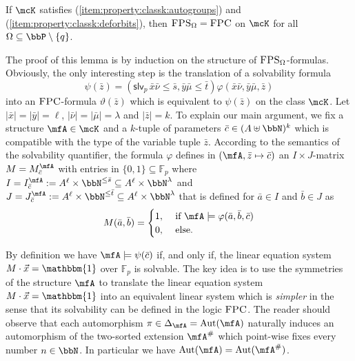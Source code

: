\documentclass[a4paper,UKenglish]{lipics}
\newcommand{\defeq}{:=}
\newcommand{\card}[1]{\ensuremath{|#1|}}
\newcommand{\field}[1]{\mathbb{#1}}
\newcommand{\Aut}{\ensuremath{\text{Aut}}\xspace}
\newcommand{\onevec}{\ensuremath{\mathbbm{1}}}
\newcommand{\N}{\ensuremath{\bbN}}
\newcommand{\logic}[1]{\ensuremath{\textsc{#1}}\xspace}
\newcommand{\FPC}{\logic{FPC}}
\newcommand{\FPSx}[1]{\ensuremath{\logic{FPS}_{#1}}\xspace}
\newcommand{\slvp}{\ensuremath{\textsf{slv}_p}\xspace}
\renewcommand{\phi}{\varphi}
\newcommand{\ba}{{\bar a}}
\newcommand{\bb}{{\bar b}}
\newcommand{\bc}{{\bar c}}
\newcommand{\bx}{{\bar x}}
\newcommand{\by}{{\bar y}}
\newcommand{\bz}{{\bar z}}
\newcommand{\bmu}{{\bar \mu}}
\newcommand{\bnu}{{\bar \nu}}
\theoremstyle{plain}
\begin{document}
\begin{lemma}
\label{lemma:fps:fpc:prop12}
 If $\mcK$ satisfies (\ref{item:property:classk:autogroups}) and
 (\ref{item:property:classk:deforbits}), then $\FPSx{\Omega} = \FPC$ on $\mcK$ 
for all $\Omega \subseteq \bbP\setminus \{q\}$.
\end{lemma}

The proof of this lemma is by induction on the structure of 
$\FPSx{\Omega}$-formulas. 
Obviously, 
the only interesting step is the translation of a solvability formula
\[  \psi(\bz) = (\slvp \, \bx\bnu\leq \bar s, \by\bmu \leq \bar t) 
\phi(\bx\bnu,\by\bmu,\bz)
\]
into an $\FPC$-formula $\vartheta(\bz)$ which is equivalent to 
$\psi(\bz)$ on the class $\mcK$.
Let $\card \bx = \card \by = \ell$, $\card \bnu = \card \bmu = \lambda$ 
and 
$\card \bz = k$. To explain our main argument, we fix a structure $\mfA 
\in \mcK$ and a $k$-tuple of parameters $\bc \in (A \uplus \N )^k$ which 
is compatible with the type of the variable tuple $\bz$. 
According to the semantics of the solvability quantifier, the formula 
$\phi$ defines in 
$(\mfA, \bz \mapsto \bc)$ an $I \times J$-matrix $M = M^{\mfA}_{\bc}$ with 
entries in $\{0,1\} \subseteq \field F_p$ where  $I = I^{\mfA}_{\bc} 
\defeq A^\ell \times {\N}^{\leq \bar s} \subseteq A^\ell \times 
{\N}^\lambda $
and $J = J^{\mfA}_{\bc} \defeq A^\ell \times {\N}^{\leq \bar t} \subseteq 
A^\ell \times 
{\N}^\lambda$ that is defined for $\ba \in  I$ and $\bb \in J$ as
\[ M(\ba,\bb) = \begin{cases}
                 1, &\text{ if } \mfA \models \phi(\ba,\bb,\bc)\\
                 0, &\text{ else.}
                \end{cases}\]

By definition we have $\mfA \models \psi(\bc)$ if, and only if, the linear 
equation system $M 
\cdot \vec x = \onevec$ over $\field F_p$ is solvable.
The key idea is to use the symmetries of the structure $\mfA$ to translate 
the linear equation system $M \cdot \vec x = \onevec$ into 
an equivalent linear system which is \emph{simpler} in the sense that its
solvability can be defined in the logic $\FPC$.
The reader should observe that each automorphism $\pi \in 
\Delta_\mfA = \Aut(\mfA)$ naturally 
induces an automorphism of the two-sorted extension $\mfA^{\#}$ which 
point-wise fixes every number $n \in \N$. In particular we 
have $\Aut(\mfA) = \Aut(\mfA^{\#})$.
\end{document}
